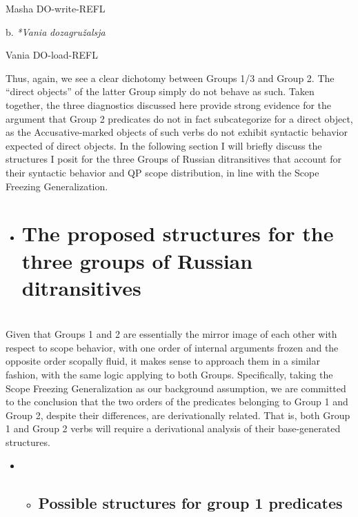 \documentclass[output=paper,modfonts, nonflat]{langsci/langscibook}
\begin{document}
\begin{styleinnerExample}
\begin{styleinnerExample}
    Masha DO-write-REFL\\\end{styleinnerExample}

\begin{styleinnerExample}
  b.  \textit{*Vania} \textit{dozagružalsja} 
\end{styleinnerExample}

\begin{styleinnerExample}
      Vania DO-load-REFL
\end{styleinnerExample}

Thus, again, we see a clear dichotomy between Groups 1/3 and Group 2. The “direct objects” of the latter Group simply do not behave as such. Taken together, the three diagnostics discussed here provide strong evidence for the argument that Group 2 predicates do not in fact subcategorize for a direct object, as the Accusative-marked objects of such verbs do not exhibit syntactic behavior expected of direct objects. In the following section I will briefly discuss the structures I posit for the three Groups of Russian ditransitives that account for their syntactic behavior and QP scope distribution, in line with the Scope Freezing Generalization.

\begin{itemize}
\item \section{The proposed structures for the three groups of Russian ditransitives}
\end{itemize}

\\
Given that Groups 1 and 2 are essentially the mirror image of each other with respect to scope behavior, with one order of internal arguments frozen and the opposite order scopally fluid, it makes sense to approach them in a similar fashion, with the same logic applying to both Groups. Specifically, taking the Scope Freezing Generalization as our background assumption, we are committed to the conclusion that the two orders of the predicates belonging to Group 1 and Group 2, despite their differences, are derivationally related. That is, both Group 1 and Group 2 verbs will require a derivational analysis of their base-generated structures.

\begin{itemize}
\item \begin{itemize}
\item \subsection{Possible structures for group 1 predicates}
\end{itemize}
\end{itemize}


\end{styleinnerExample}
\end{document}
